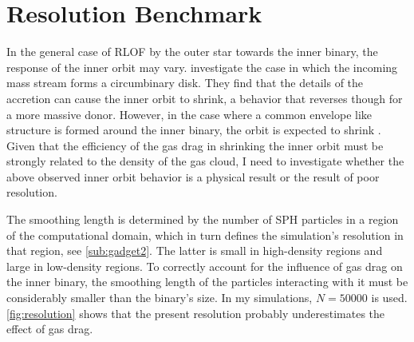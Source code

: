 \section{Resolution Benchmark}\label{sec:resolution}

In the general case of RLOF by the outer star towards the inner binary, the response of the inner orbit may vary. \cite{zwart2019triple} investigate the case in which the incoming mass stream forms a circumbinary disk. They find that the details of the accretion can cause the inner orbit to shrink, a behavior that reverses though for a more massive donor. However, in the case where a common envelope like structure is formed around the inner binary, the orbit is expected to shrink \citep{de2014evolution}. Given that the efficiency of the gas drag in shrinking the inner orbit must be strongly related to the density of the gas cloud, I need to investigate whether the above observed inner orbit behavior is a physical result or the result of poor resolution.

The smoothing length is determined by the number of SPH particles in a region of the computational domain, which in turn defines the simulation's resolution in that region, see \cref{sub:gadget2}. The latter is small in high-density regions and large in low-density regions. To correctly account for the influence of gas drag on the inner binary, the smoothing length of the particles interacting with it must be considerably smaller than the binary's size. In my simulations, $N=50000$ is used. \cref{fig:resolution} shows that the present resolution probably underestimates the effect of gas drag.

